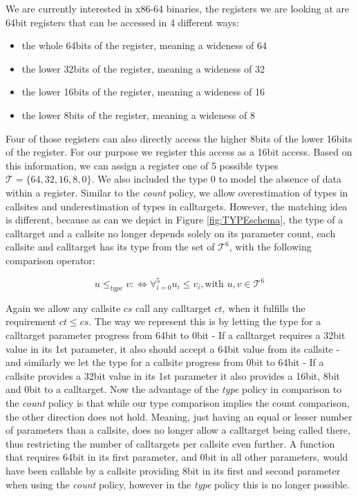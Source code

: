 We are currently interested in x86-64 binaries, the registers we are looking at are 64bit registers that can be accessed in 4 different ways:
\begin{itemize}
\item the whole 64bits of the register, meaning a wideness of 64
\item the lower 32bits of the register, meaning a wideness of 32
\item the lower 16bits of the register, meaning a wideness of 16
\item the lower 8bits of the register, meaning a wideness of 8
\end{itemize}

Four of those registers can also directly access the higher 8bits of the lower 16bits of the register. For our purpose we register this access as a 16bit access. Based on this information, we can assign a register one of 5 possible types $\mathcal{T} = \{64, 32, 16, 8, 0\}$. We also included the type 0 to model the absence of data within a register. Similar to the \emph{count} policy, we allow overestimation of types in callsites and underestimation of types in calltargets. However, the matching idea is different, because as can we depict in Figure \ref{fig:TYPEschema}, the type of a calltarget and a callsite no longer depends solely on its parameter count, each callsite and calltarget has its type from the set of $\mathcal{T}^6$, with the following comparison operator:

\[
	u \leq_{type} v :\Longleftrightarrow  \forall_{i = 0}^{5} {u_i \leq v_i} , \text {with } u, v \in \mathcal{T}^6
\]

Again we allow any callsite $cs$ call any calltarget $ct$, when it fulfills the requirement $ct \leq cs$. The way we represent this is by letting the type for a calltarget parameter progress from 64bit to 0bit - If a calltarget requires a 32bit value in its 1st parameter, it also should accept a 64bit value from its callsite - and similarly we let the type for a callsite progress from 0bit to 64bit - If a callsite provides a 32bit value in its 1st parameter it also provides a 16bit, 8bit and 0bit to a calltarget. Now the advantage of the \emph{type} policy in comparison to the \emph{count} policy is that while our type comparison implies the count comparison, the other direction does not hold. Meaning, just having an equal or lesser number of parameters than a callsite, does no longer allow a calltarget being called there, thus restricting the number of calltargets per callsite even further. A function that requires 64bit in its first parameter, and 0bit in all other parameters, would have been callable by a callsite providing 8bit in its first and second parameter when using the \emph{count} policy, however in the \emph{type} policy this is no longer possible.


